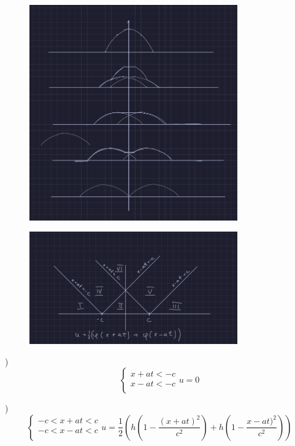 \documentclass[a4paper]{article}
\begin{document}
\begin{figure}[!ht]
    \centering
    \includegraphics[width=0.8\textwidth]{mp-sem-pic4.png}
\end{figure}

\begin{figure}[!ht]
    \centering
    \includegraphics[width=0.8\textwidth]{mp-sem-pic5.png}
\end{figure}

)
\[
    \begin{cases}
        x + at < -c\\
        x - at < -c\\
    \end{cases}
    u = 0
\]

)
\[
    \begin{cases}
        -c < x + at < c\\
        -c < x - at < c\\
    \end{cases}
    u = \frac{1}{2} \left( h \left( 1 - \frac{(x + at)^2}{c^2} \right) + h
        \left( 1 - \frac{x - at)^2}{c^2} \right) \right) 
\]
\end{document}

